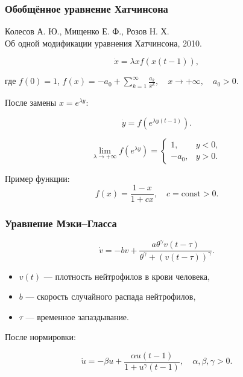 \begin{frame}
	\frametitle{Обобщённое уравнение Хатчинсона}
	
	Колесов А. Ю., Мищенко Е. Ф., Розов Н. Х.\\
	Об одной модификации уравнения Хатчинсона, 2010.
	
	\begin{equation*}
		\dot{x} = \lambda x f(x(t - 1)),
	\end{equation*}
	
	где $f(0) = 1$, \quad $f(x) = -a_0 + \sum\limits_{k = 1}^{\infty} \frac{a_k}{x^k}, \quad x \to +\infty, \quad a_0 > 0.$
	
	\pause
	\bigskip
	
	После замены $x = e^{\lambda y}$:
	
	\[
	\dot{y} = f(e^{\lambda y(t - 1)}).
	\]
	
	\pause
	
	\bigskip
	\[
	\lim\limits_{\lambda \to +\infty} f(e^{\lambda y}) = 
	\begin{cases}
		1, & y < 0,\\
		-a_0, & y > 0.
	\end{cases}
	\]
	
	\pause
	
	\bigskip

Пример функции:
	\[
	f(x) = \dfrac{1 - x}{1 + cx}, \quad c = \text{const} > 0.
	\]
	
\end{frame}

\begin{frame}
	\frametitle{Уравнение Мэки--Гласса}
	
	\begin{equation*}
		\label{eq:mg_equation_1:intro}
		\dot{v}=-b v+\frac{a \theta^{\gamma} v(t-\tau)}{\theta^{\gamma}+(v(t-\tau))^{\gamma}}.
	\end{equation*}
	\begin{itemize}
		\item $v(t)$ --- плотность нейтрофилов в крови человека,
		\item $b$ --- скорость случайного распада нейтрофилов,
		\item $\tau$ --- временное запаздывание.
	\end{itemize}
	
	\pause
	\bigskip
	
	После нормировки:
	
	\begin{equation*}
		\dot{u}=-\beta u + \frac{\alpha u(t - 1)}{1 + u^{\gamma}(t - 1)}, 
		\quad \alpha, \beta, \gamma > 0.
	\end{equation*}
\end{frame}

